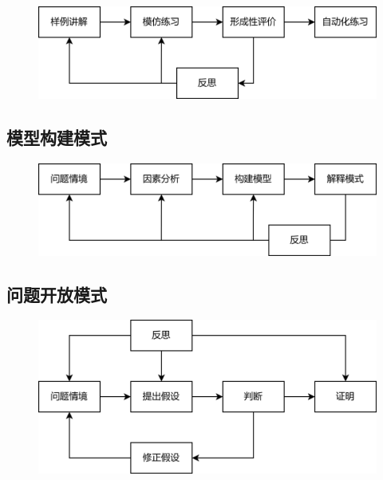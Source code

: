 \begin{figure}[H]
    \centering
    \includegraphics[width=0.5\linewidth]{image/自动化技能形成模式.png}
\end{figure}

\subsection{模型构建模式}

\begin{figure}[H]
    \centering
    \includegraphics[width=0.5\linewidth]{image/模型构建模式.png}
\end{figure}

\subsection{问题开放模式}

\begin{figure}[H]
    \centering
    \includegraphics[width=0.5\linewidth]{image/问题开放模式.png}
\end{figure}